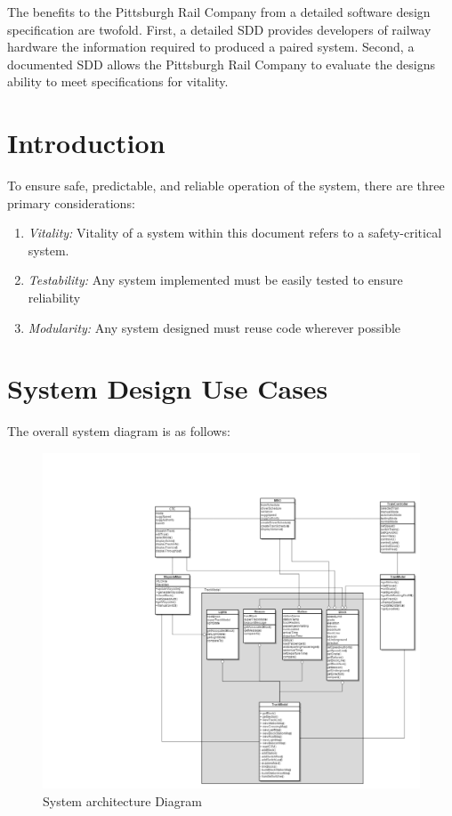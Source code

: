 \documentclass[]{article}
\begin{document}
The benefits to the Pittsburgh Rail Company from  a detailed software design specification are twofold. First, a detailed SDD provides developers of railway hardware the information required to produced a paired system. Second, a documented SDD allows the Pittsburgh Rail Company to evaluate the designs ability to meet specifications for vitality.

\section{Introduction}
To ensure safe, predictable, and reliable operation of the system, there are three primary considerations:
\begin{enumerate}
	\item \emph{Vitality:} Vitality of a system within this document refers to a safety-critical system.
	\item \emph{Testability:} Any system implemented must be easily tested to ensure reliability
	\item \emph{Modularity:} Any system designed must reuse code wherever possible
\end{enumerate}

\section{System Design Use Cases}
The overall system diagram is as follows:
\begin{figure}[H]
	\centering
	\includegraphics[width=\textwidth]{overallsystem.png}
	\caption{System architecture Diagram}
\end{figure}
\end{document}
